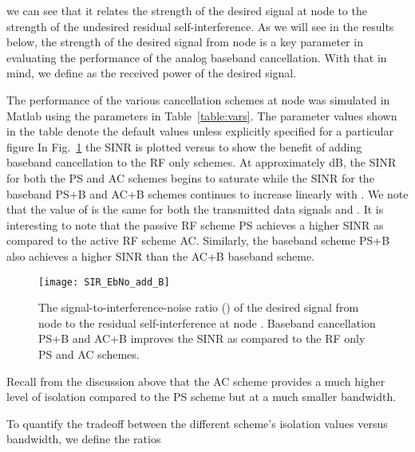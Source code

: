 \documentclass[12pt, journal,draftcls,letterpaper,onecolumn]{IEEEtran}
\begin{document}
we can see that it relates the strength of the desired signal at node  to the strength of the undesired residual self-interference.  As we will see in the results below, the strength of the desired signal from node  is a key parameter in evaluating the performance of the analog baseband cancellation.  With that in mind, we define  as the received power of the desired signal.  


The performance of the various cancellation schemes at node  was simulated in Matlab using the parameters in Table~\ref{table:vars}. The parameter values shown in the table denote the default values unless explicitly specified for a particular figure  In Fig.~\ref{fig:SIR_add_B} the SINR is plotted versus  to show the benefit of adding baseband cancellation to the RF only schemes.  At approximately  dB, the SINR for both the PS and AC schemes begins to saturate while the SINR for the baseband PS+B and AC+B schemes continues to increase linearly with .  We note that the value of  is the same for both the transmitted data signals  and .  It is interesting to note that the passive RF scheme PS achieves a higher SINR as compared to the active RF scheme AC.  Similarly, the baseband scheme PS+B also achieves a higher SINR than the AC+B baseband scheme.  
\begin{figure}[htp]
\begin{center} 
  \texttt{[image: SIR\_EbNo\_add\_B]}
\caption[fig:chan_ang]{The signal-to-interference-noise ratio () of the desired signal from node  to the residual self-interference at node .  Baseband cancellation PS+B and AC+B improves the SINR as compared to the RF only PS and AC schemes.} 
  \label{fig:SIR_add_B}
\end{center} 
\end{figure} 
Recall from the discussion above that the AC scheme provides a much higher level of isolation compared to the PS scheme but at a much smaller bandwidth.  

To quantify the tradeoff between the different scheme's isolation values versus bandwidth, we define the ratios
\end{document}
